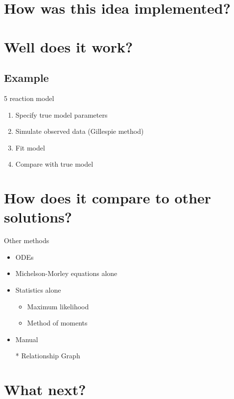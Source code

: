 \documentclass{beamer}
\begin{document}
\section{How was this idea implemented?}

\section{Well does it work?}

\subsection{Example}

5 reaction model
\begin{enumerate}
\item Specify true model parameters
\item Simulate observed data (Gillespie method)
\item Fit model
\item Compare with true model
\end{enumerate}

\section{How does it compare to other solutions?}

Other methods
\begin{itemize}
\item ODEs
\item Michelson-Morley equations alone
\item Statistics alone
  \begin{itemize}
  \item Maximum likelihood
  \item Method of moments
  \end{itemize}
\item Manual
\item[*] Relationship Graph
\end{itemize}

\section{What next?}
\end{document}
